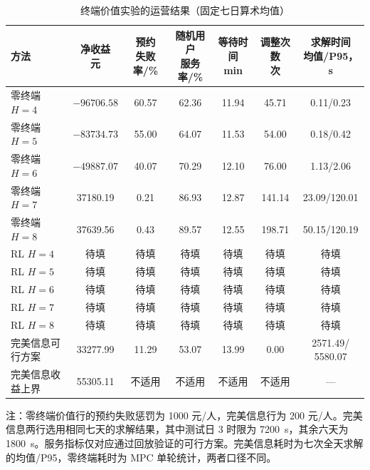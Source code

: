 \begin{table}[!htbp]
  \centering
  \caption{终端价值实验的运营结果（固定七日算术均值）}
  \label{exp:value_results}
  \small
  \setlength{\tabcolsep}{3pt}
  \begin{tabularx}{\linewidth}{@{}Xcccccc@{}}
    \toprule
    方法 & \shortstack{净收益\\元} & \shortstack{预约\\失败率/\%} & \shortstack{随机用户\\服务率/\%} & \shortstack{等待时间\\min} & \shortstack{调整次数\\次} & \shortstack{求解时间\\均值/P95，s} \\
    \midrule
    零终端 $H=4$ & $-96706.58$ & 60.57 & 62.36 & 11.94 & 45.71 & 0.11/0.23 \\
    零终端 $H=5$ & $-83734.73$ & 55.00 & 64.07 & 11.53 & 54.00 & 0.18/0.42 \\
    零终端 $H=6$ & $-49887.07$ & 40.07 & 70.29 & 12.10 & 76.00 & 1.13/2.06 \\
    零终端 $H=7$ & 37180.19 & 0.21 & 86.93 & 12.87 & 141.14 & 23.09/120.01 \\
    零终端 $H=8$ & 37639.56 & 0.43 & 89.57 & 12.55 & 198.71 & 50.15/120.19 \\
    \midrule
    RL $H=4$ & 待填 & 待填 & 待填 & 待填 & 待填 & 待填 \\
    RL $H=5$ & 待填 & 待填 & 待填 & 待填 & 待填 & 待填 \\
    RL $H=6$ & 待填 & 待填 & 待填 & 待填 & 待填 & 待填 \\
    RL $H=7$ & 待填 & 待填 & 待填 & 待填 & 待填 & 待填 \\
    RL $H=8$ & 待填 & 待填 & 待填 & 待填 & 待填 & 待填 \\
    \midrule
    完美信息可行方案 & 33277.99 & 11.29 & 53.07 & 13.99 & 0.00 & \shortstack{2571.49/\\5580.07} \\
    完美信息收益上界 & 55305.11 & 不适用 & 不适用 & 不适用 & 不适用 & --- \\
    \bottomrule
  \end{tabularx}
  \par\smallskip
  \parbox{\linewidth}{\footnotesize 注：零终端价值行的预约失败惩罚为 1000 元/人，完美信息行为 200 元/人。完美信息两行选用相同七天的求解结果，其中测试日 3 时限为 7200~s，其余六天为 1800~s。服务指标仅对应通过回放验证的可行方案。完美信息耗时为七次全天求解的均值/P95，零终端耗时为 MPC 单轮统计，两者口径不同。}
\end{table}

